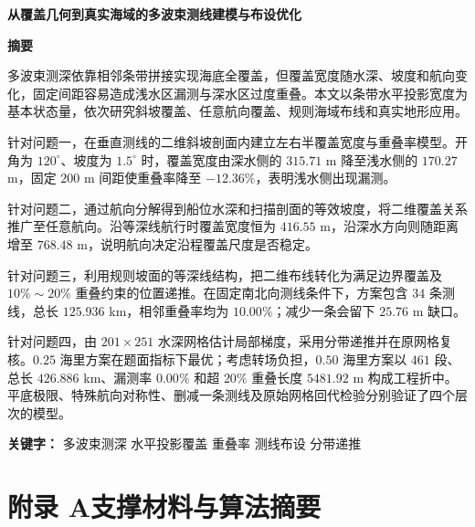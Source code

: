 \documentclass[fontset=windows, 12pt, a4paper]{ctexart}
\newcommand{\papertitle}[1]{%
  \thispagestyle{empty}%
  \begin{center}
    {\fontsize{17.3pt}{22pt}\bfseries #1}
  \end{center}
  \vspace{1em}
}
\newcommand{\abstractcn}[2]{%
  \thispagestyle{empty}%
  \begin{center}{\fontsize{14pt}{17pt}\bfseries 摘要}\end{center}
  #1\par
  \vspace{1em}
  {\heiti\bfseries 关键字：}#2\par
  \newpage
}
\newcommand{\referencescn}{%
}
\newcommand{\appendixcn}{%
  \section*{附录 A\quad 支撑材料与算法摘要}%
}
\begin{document}
\papertitle{从覆盖几何到真实海域的多波束测线建模与布设优化}

\abstractcn{%
多波束测深依靠相邻条带拼接实现海底全覆盖，但覆盖宽度随水深、坡度和航向变化，固定间距容易造成浅水区漏测与深水区过度重叠。本文以条带水平投影宽度为基本状态量，依次研究斜坡覆盖、任意航向覆盖、规则海域布线和真实地形应用。

针对问题一，在垂直测线的二维斜坡剖面内建立左右半覆盖宽度与重叠率模型。开角为 $120^\circ$、坡度为 $1.5^\circ$ 时，覆盖宽度由深水侧的 $315.71$ m 降至浅水侧的 $170.27$ m，固定 $200$ m 间距使重叠率降至 $-12.36\%$，表明浅水侧出现漏测。

针对问题二，通过航向分解得到船位水深和扫描剖面的等效坡度，将二维覆盖关系推广至任意航向。沿等深线航行时覆盖宽度恒为 $416.55$ m，沿深水方向则随距离增至 $768.48$ m，说明航向决定沿程覆盖尺度是否稳定。

针对问题三，利用规则坡面的等深线结构，把二维布线转化为满足边界覆盖及 $10\%\sim20\%$ 重叠约束的位置递推。在固定南北向测线条件下，方案包含 $34$ 条测线，总长 $125.936$ km，相邻重叠率均为 $10.00\%$；减少一条会留下 $25.76$ m 缺口。

针对问题四，由 $201\times251$ 水深网格估计局部梯度，采用分带递推并在原网格复核。$0.25$ 海里方案在题面指标下最优；考虑转场负担，$0.50$ 海里方案以 $461$ 段、总长 $426.886$ km、漏测率 $0.00\%$ 和超 $20\%$ 重叠长度 $5481.92$ m 构成工程折中。平底极限、特殊航向对称性、删减一条测线及原始网格回代检验分别验证了四个层次的模型。%
}{%
多波束测深 \quad 水平投影覆盖 \quad 重叠率 \quad 测线布设 \quad 分带递推%
}









\referencescn
\newpage
\appendixcn
\end{document}
